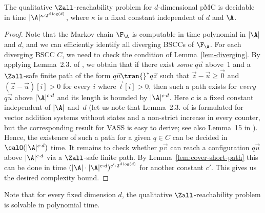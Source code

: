 \begin{theorem}
\label{thm:qual-all-algorithm}
  The qualitative $\Zall$-reachability problem for \mbox{$d$-dimensional}
  pMC is decidable in time $|\A|^{\kappa \cdot 2^{d\log(d)}}$, where $\kappa$ is 
  a fixed constant independent of $d$ and $\A$. 
\end{theorem}
\begin{proof}
  Note that the Markov chain $\F_\A$ is computable in time polynomial
  in $|\A|$ and $d$, and we can efficiently identify all diverging
  BSCCs of $\F_\A$. For each diverging BSCC $C$, we need to check the
  condition of Lemma~\ref{lem-diverging}. By applying Lemma~2.3.{}
  of \cite{RY:VASS-JCSS}, we obtain that if there exist \emph{some} $q\vec{u}$ 
  above~$1$ and a $\Zall$-safe finite path of the form 
  $q\vec{u} \tran{}^* q\vec{z}$ such that $\vec{z} - \vec{u} \geq \vec{0}$
  and $(\vec{z} - \vec{u})[i] > 0$ for every $i$ where $\vec{t}[i] > 0$,
  then such a path exists for \emph{every} $q\vec{u}$ above
  $|\A|^{c\cdot d}$ and its length is bounded by $|\A|^{c\cdot d}$. Here
  $c$ is a fixed constant independent of $|\A|$ and~$d$ (let us
  note that Lemma~2.3.{} of \cite{RY:VASS-JCSS} is formulated for 
  vector addition
  systems without states and a non-strict increase in every counter, 
  but the corresponding result for VASS is easy
  to derive; see also Lemma~15 in \cite{BJK:VASS-games-arxiv}). 
  Hence, the existence
  of such a path for a given $q \in C$ can be decided in 
  $\calO(|\A|^{c\cdot d})$ time. It remains to check whether $p\vec{v}$
  can reach a configuration $q\vec{u}$ above  $|\A|^{c\cdot d}$ via
  a $\Zall$-safe finite path. By Lemma~\ref{lem:cover-short-path} this can be done in time $(|\A|\cdot |\A|^{c\cdot d})^{c'\cdot 2^{d\log(d)}}$ for another constant $c'$. This gives us the desired complexity bound.
\end{proof}




















\smallskip

Note that for every fixed dimension $d$, the qualitative 
\mbox{$\Zall$-reachability} problem is solvable in polynomial time.









